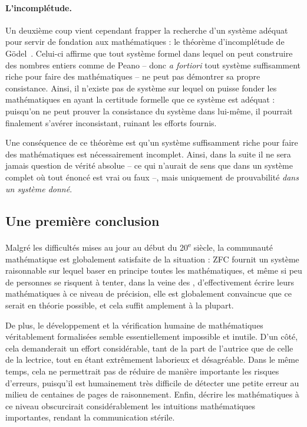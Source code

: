 \paragraph{L’incomplétude.}
Un deuxième coup vient cependant frapper la recherche d’un système adéquat pour
servir de fondation aux mathématiques : le théorème d’incomplétude de
Gödel~. Celui-ci affirme que tout système formel
dans lequel on peut construire des nombres entiers comme de Peano – donc
\textit{a fortiori} tout système suffisamment riche pour faire des mathématiques –
ne peut pas démontrer sa propre consistance. Ainsi, il n’existe pas de
système sur lequel on puisse fonder les mathématiques en ayant la certitude
formelle que ce système est adéquat : puisqu’on ne peut prouver la consistance du
système dans lui-même, il pourrait finalement s’avérer inconsistant, ruinant les
efforts fournis.

Une conséquence de ce théorème est qu’un système suffisamment riche
pour faire des mathématiques est nécessairement incomplet.
Ainsi, dans la suite il ne sera jamais question de vérité absolue –
ce qui n’aurait de sens que dans un système complet
où tout énoncé est vrai ou faux –, mais
uniquement de prouvabilité \emph{dans un système donné}.

\subsection{Une première conclusion}
Malgré les difficultés mises au jour au début du 20\textsuperscript{e}
siècle, la communauté mathématique est globalement
satisfaite de la situation : ZFC fournit un système raisonnable sur
lequel baser en principe toutes les mathématiques, et même si peu de
personnes se risquent à tenter, dans la veine des ,
d’effectivement écrire leurs mathématiques à ce niveau de précision,
elle est globalement convaincue que ce serait en théorie
possible, et cela suffit amplement à la plupart.

De plus, le développement et la vérification humaine de mathématiques véritablement
formalisées semble essentiellement impossible et inutile.
D’un côté, cela demanderait un effort considérable,
tant de la part de l’autrice que de celle de la lectrice, tout en étant
extrêmement laborieux et désagréable.
Dans le même temps, cela ne permettrait pas de réduire de manière importante
les risques d’erreurs, puisqu’il est
humainement très difficile de détecter une petite erreur au milieu de centaines de pages de raisonnement.
Enfin, décrire les mathématiques à ce niveau obscurcirait
considérablement les intuitions mathématiques importantes,
rendant la communication stérile.

